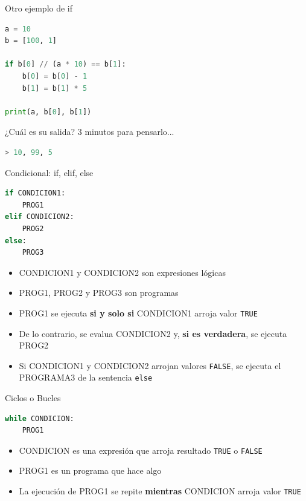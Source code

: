 \documentclass{beamer}
\begin{document}
\begin{frame}[fragile]{Otro ejemplo de if}
\begin{lstlisting}[language=Python]
a = 10
b = [100, 1]

if b[0] // (a * 10) == b[1]:
    b[0] = b[0] - 1
    b[1] = b[1] * 5

print(a, b[0], b[1])
\end{lstlisting} \pause

¿Cuál es su salida? 3 minutos para pensarlo... \pause 
\begin{lstlisting}[language=Python]
> 10, 99, 5
\end{lstlisting}
\end{frame}

\begin{frame}[fragile]{Condicional: if, elif, else} \pause

\begin{lstlisting}[language=Python]
if CONDICION1:
    PROG1
elif CONDICION2:
    PROG2
else:
    PROG3
\end{lstlisting} \pause

\begin{itemize}
    \item CONDICION1 y CONDICION2 son expresiones lógicas
    \item PROG1, PROG2 y PROG3  son programas 
    \item PROG1 se ejecuta \textbf{si y solo si} CONDICION1 arroja valor \texttt{TRUE}\pause
    \item De lo contrario, se evalua CONDICION2 y, \textbf{si es verdadera}, se ejecuta PROG2 \pause
    \item Si CONDICION1 y CONDICION2 arrojan valores \texttt{FALSE}, se ejecuta el PROGRAMA3 de la sentencia \texttt{else}
\end{itemize}
\end{frame}

\begin{frame}[fragile]{Ciclos o Bucles}\pause
\begin{lstlisting}[language=Python]
while CONDICION:
    PROG1
\end{lstlisting} \pause
\begin{itemize}
    \item CONDICION es una expresión que arroja resultado \texttt{TRUE} o \texttt{FALSE}
    \item PROG1 es un programa que hace algo
    \item La ejecución de PROG1 se repite \textbf{mientras} CONDICION arroja valor \texttt{TRUE}
\end{itemize}
\end{frame}
\end{document}
